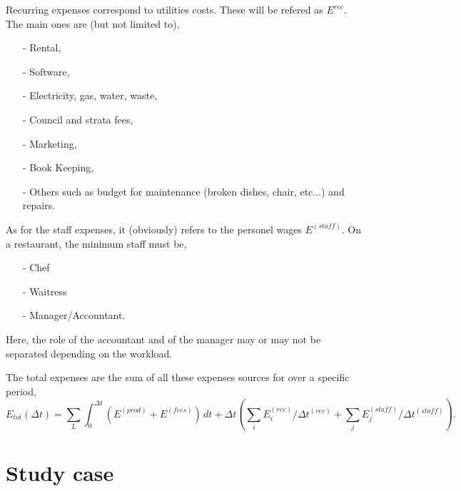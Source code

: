 \documentclass{article}
\begin{document}
Recurring expenses correspond to utilities costs. These will be refered as $E^{rec}$. The main ones are (but not limited to),
\begin{itemize}
    \item[-] Rental,
    \item[-] Software,
    \item[-] Electricity, gas, water, waste,
    \item[-] Council and strata fees,
    \item[-] Marketing,
    \item[-] Book Keeping,
    \item[-] Others such as budget for maintenance (broken dishes, chair, etc...) and repairs.
\end{itemize}


As for the staff expenses, it (obviously) refers to the personel wages $E^{(staff)}$. On a restaurant, the minimum staff must be,
\begin{itemize}
    \item[-] Chef
    \item[-] Waitress
    \item[-] Manager/Accountant.
\end{itemize}
Here, the role of the accountant and of the manager may or may not be separated depending on the workload.

The total expenses are the sum of all these expenses sources for over a specific period,
\begin{equation}
    E_{tot}(\Delta t) = \sum_L \int^{\Delta t}_0 \left(E^{(prod)} + E^{(fees)}\right) \, dt + \Delta t\left(\sum_i  E^{(rec)}_i/\Delta t^{(rec)} + \sum_j  E^{(staff)}_j/\Delta t^{(staff)}\right).
\end{equation}

\section{Study case} \label{sec:6}
\end{document}
